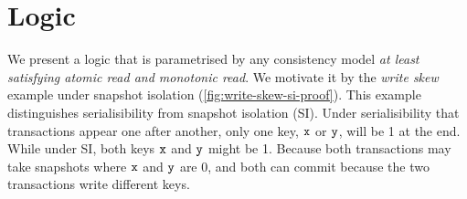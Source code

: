 \section{Logic}

We present a logic that is parametrised by any consistency model \emph{at least satisfying atomic  read and monotonic read}.
We motivate it by the \emph{write skew} example under snapshot isolation (\cref{fig:write-skew-si-proof}).
This example distinguishes serialisibility from snapshot isolation (SI).
Under serialisibility that transactions appear one after another, only one key, \( \texttt{x} \) or \( \texttt{y} \), will be 1 at the end.
While under SI, both keys \( \texttt{x} \) and \( \texttt{y} \) might be 1.
Because both transactions may take snapshots where \( \texttt{x} \) and \( \texttt{y} \) are 0, and both can commit because the two transactions write different keys.

